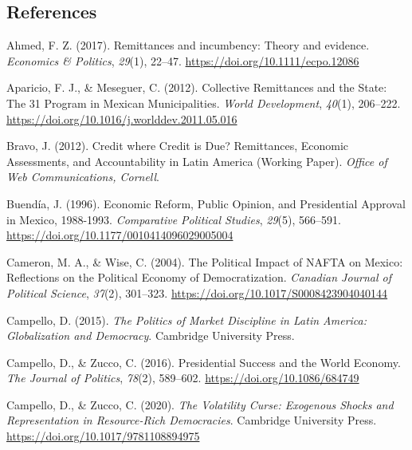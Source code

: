 \documentclass[
]{article}
\newlength{\cslhangindent}
\newlength{\cslentryspacingunit} %
\newenvironment{CSLReferences}[2] %
 {%
  \setlength{\parindent}{0pt}
  \ifodd #1
  \let\oldpar\par
  \def\par{\hangindent=\cslhangindent\oldpar}
  \fi
  \setlength{\parskip}{#2\cslentryspacingunit}
 }%
 {}
\begin{document}
\singlespacing

\hypertarget{references}{%
\subsection{References}\label{references}}

\hypertarget{refs}{}
\begin{CSLReferences}{1}{0}
\leavevmode{}%
Ahmed, F. Z. (2017). Remittances and incumbency: {Theory} and evidence.
\emph{Economics \& Politics}, \emph{29}(1), 22--47.
\url{https://doi.org/10.1111/ecpo.12086}

\leavevmode{}%
Aparicio, F. J., \& Meseguer, C. (2012). Collective {Remittances} and
the {State}: {The} 3{\texttimes}1 {Program} in {Mexican Municipalities}.
\emph{World Development}, \emph{40}(1), 206--222.
\url{https://doi.org/10.1016/j.worlddev.2011.05.016}

\leavevmode{}%
Bravo, J. (2012). Credit where {Credit} is {Due}? {Remittances},
{Economic Assessments}, and {Accountability} in {Latin America}
({Working Paper}). \emph{Office of {Web Communications}, {Cornell}}.

\leavevmode{}%
Buendía, J. (1996). Economic {Reform}, {Public Opinion}, and
{Presidential Approval} in {Mexico}, 1988-1993. \emph{Comparative
Political Studies}, \emph{29}(5), 566--591.
\url{https://doi.org/10.1177/0010414096029005004}

\leavevmode{}%
Cameron, M. A., \& Wise, C. (2004). The {Political Impact} of {NAFTA} on
{Mexico}: {Reflections} on the {Political Economy} of {Democratization}.
\emph{Canadian Journal of Political Science}, \emph{37}(2), 301--323.
\url{https://doi.org/10.1017/S0008423904040144}

\leavevmode{}%
Campello, D. (2015). \emph{The {Politics} of {Market Discipline} in
{Latin America}: {Globalization} and {Democracy}}. {Cambridge University
Press}.

\leavevmode{}%
Campello, D., \& Zucco, C. (2016). Presidential {Success} and the {World
Economy}. \emph{The Journal of Politics}, \emph{78}(2), 589--602.
\url{https://doi.org/10.1086/684749}

\leavevmode{}%
Campello, D., \& Zucco, C. (2020). \emph{The {Volatility Curse}:
{Exogenous Shocks} and {Representation} in {Resource-Rich Democracies}}.
{Cambridge University Press}.
\url{https://doi.org/10.1017/9781108894975}


\end{CSLReferences}
\end{document}
